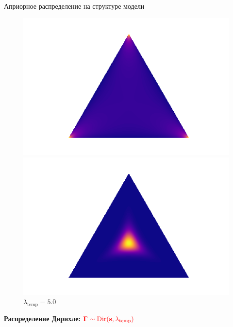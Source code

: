 \documentclass[10pt,pdf,utf8,russian,aspectratio=169]{beamer}
\begin{document}
\begin{frame}{Априорное распределение на структуре модели}
\begin{figure}
\begin{minipage}[t]{.2\textwidth}
\begin{tikzpicture}[%
x={(1.7cm,0cm)},
y={(0cm,1.7cm)},
]
\end{tikzpicture}
\caption*{$\lambda_\text{temp}\to0$}
\end{minipage}
\hfill
 \begin{minipage}[t]{.2\textwidth}
   \includegraphics[width=\textwidth]{gs0995.png}
\caption*{$\lambda_\text{temp}=0.995$}
\end{minipage}
\hfill
 \begin{minipage}[t]{.2\textwidth}
   \includegraphics[width=\textwidth]{gs5.png}
\caption*{$\lambda_\text{temp}=5.0$}
\end{minipage}

\end{figure}

\textbf{Распределение Дирихле: }$\textcolor{red}{\boldsymbol{\Gamma}\sim \text{Dir}(\mathbf{s}, \lambda_\text{temp})}$\\
\begin{figure}
 \begin{minipage}[t]{.2\textwidth}
        \centering
\begin{tikzpicture}[%
x={(1.7cm,0cm)},
y={(0cm,1.7cm)},
]


\end{tikzpicture}
\end{minipage}
\end{figure}
\end{frame}
\end{document}
